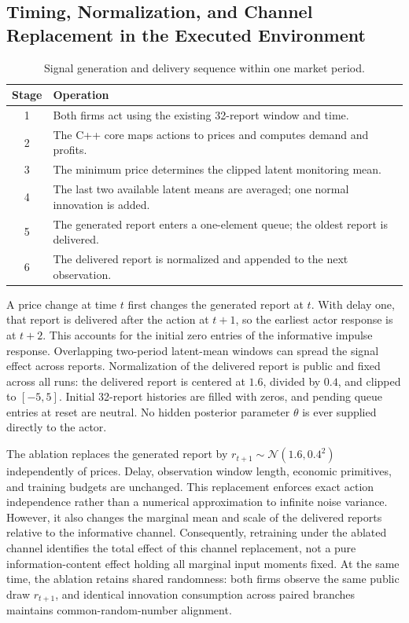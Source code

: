 \documentclass{article}
\begin{document}
\subsection{Timing, Normalization, and Channel Replacement in the Executed Environment}

\begin{table}[t]
\centering
\caption{Signal generation and delivery sequence within one market period.}
\label{tab:timing}
\small
\begin{tabular}{@{}cl@{}}
\toprule
Stage & Operation \\
\midrule
1 & Both firms act using the existing 32-report window and time. \\
2 & The C++ core maps actions to prices and computes demand and profits. \\
3 & The minimum price determines the clipped latent monitoring mean. \\
4 & The last two available latent means are averaged; one normal innovation is added. \\
5 & The generated report enters a one-element queue; the oldest report is delivered. \\
6 & The delivered report is normalized and appended to the next observation. \\
\bottomrule
\end{tabular}
\end{table}

A price change at time $t$ first changes the generated report at $t$. With delay one, that report is delivered after the action at $t+1$, so the earliest actor response is at $t+2$. This accounts for the initial zero entries of the informative impulse response. Overlapping two-period latent-mean windows can spread the signal effect across reports. Normalization of the delivered report is public and fixed across all runs: the delivered report is centered at $1.6$, divided by $0.4$, and clipped to $[-5,5]$. Initial 32-report histories are filled with zeros, and pending queue entries at reset are neutral. No hidden posterior parameter $\theta$ is ever supplied directly to the actor.

The ablation replaces the generated report by $r_{t+1} \sim \mathcal{N}(1.6, 0.4^2)$ independently of prices. Delay, observation window length, economic primitives, and training budgets are unchanged. This replacement enforces exact action independence rather than a numerical approximation to infinite noise variance. However, it also changes the marginal mean and scale of the delivered reports relative to the informative channel. Consequently, retraining under the ablated channel identifies the total effect of this channel replacement, not a pure information-content effect holding all marginal input moments fixed. At the same time, the ablation retains shared randomness: both firms observe the same public draw $r_{t+1}$, and identical innovation consumption across paired branches maintains common-random-number alignment.
\end{document}

